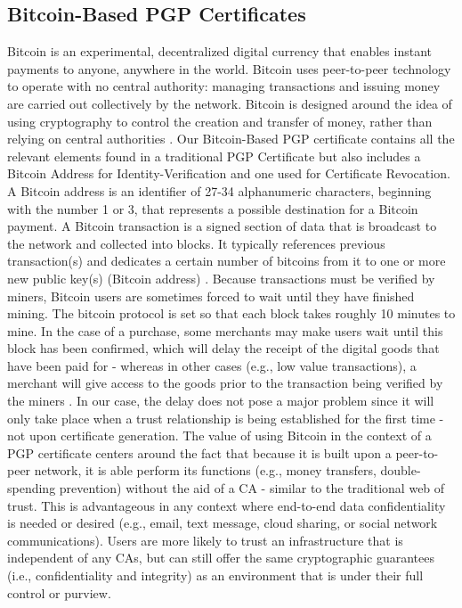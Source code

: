 \documentclass{llncs}
\begin{document}
\subsection{Bitcoin-Based PGP Certificates}
Bitcoin is an experimental, decentralized digital currency that enables instant payments to anyone, anywhere in the world. Bitcoin uses peer-to-peer technology to operate with no central authority: managing transactions and issuing money are carried out collectively by the network. Bitcoin is designed around the idea of using cryptography to control the creation and transfer of money, rather than relying on central authorities \cite{bitcoinmain,bitcoinworks}.  Our Bitcoin-Based PGP certificate contains all the relevant elements found in a traditional PGP Certificate but also includes a Bitcoin Address for Identity-Verification and one used for Certificate Revocation.  A Bitcoin address is an identifier of 27-34 alphanumeric characters, beginning with the number 1 or 3, that represents a possible destination for a Bitcoin payment.  A Bitcoin transaction is a signed section of data that is broadcast to the network and collected into blocks. It typically references previous transaction(s) and dedicates a certain number of bitcoins from it to one or more new public key(s) (Bitcoin address) \cite{bitcointrans}.  Because transactions must be verified by miners, Bitcoin users are sometimes forced to wait until they have finished mining. The bitcoin protocol is set so that each block takes roughly 10 minutes to mine. In the case of a purchase, some merchants may make users wait until this block has been confirmed, which will delay the receipt of the digital goods that have been paid for - whereas in other cases (e.g., low value transactions), a merchant will give access to the goods prior to the transaction being verified by the miners \cite{coindesk}. In our case, the delay does not pose a major problem since it will only take place when a trust relationship is being established for the first time - not upon certificate generation.  The value of using Bitcoin in the context of a PGP certificate centers around the fact that because it is built upon a peer-to-peer network, it is able perform its functions (e.g., money transfers, double-spending prevention) without the aid of a CA - similar to the traditional web of trust.  This is advantageous in any context where end-to-end data confidentiality is needed or desired (e.g., email, text message, cloud sharing, or social network communications).  Users are more likely to trust an infrastructure that is independent of any CAs, but can still offer the same cryptographic guarantees (i.e., confidentiality and integrity) as an environment that is under their full control or purview. 
\end{document}
